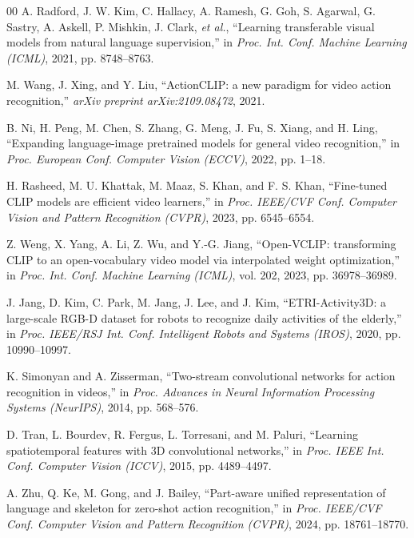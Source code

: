 \documentclass[conference]{IEEEtran}
\begin{document}
\begin{thebibliography}{00}
A. Radford, J. W. Kim, C. Hallacy, A. Ramesh, G. Goh, S. Agarwal, G. Sastry, A. Askell, P. Mishkin, J. Clark, \textit{et al.},
``Learning transferable visual models from natural language supervision,''
in \textit{Proc. Int. Conf. Machine Learning (ICML)}, 2021, pp. 8748--8763.

M. Wang, J. Xing, and Y. Liu,
``ActionCLIP: a new paradigm for video action recognition,''
\textit{arXiv preprint arXiv:2109.08472}, 2021.

B. Ni, H. Peng, M. Chen, S. Zhang, G. Meng, J. Fu, S. Xiang, and H. Ling,
``Expanding language-image pretrained models for general video recognition,''
in \textit{Proc. European Conf. Computer Vision (ECCV)}, 2022, pp. 1--18.

H. Rasheed, M. U. Khattak, M. Maaz, S. Khan, and F. S. Khan,
``Fine-tuned CLIP models are efficient video learners,''
in \textit{Proc. IEEE/CVF Conf. Computer Vision and Pattern Recognition (CVPR)}, 2023, pp. 6545--6554.

Z. Weng, X. Yang, A. Li, Z. Wu, and Y.-G. Jiang,
``Open-VCLIP: transforming CLIP to an open-vocabulary video model via interpolated weight optimization,''
in \textit{Proc. Int. Conf. Machine Learning (ICML)}, vol. 202, 2023, pp. 36978--36989.

J. Jang, D. Kim, C. Park, M. Jang, J. Lee, and J. Kim,
``ETRI-Activity3D: a large-scale RGB-D dataset for robots to recognize daily activities of the elderly,''
in \textit{Proc. IEEE/RSJ Int. Conf. Intelligent Robots and Systems (IROS)}, 2020, pp. 10990--10997.

K. Simonyan and A. Zisserman,
``Two-stream convolutional networks for action recognition in videos,''
in \textit{Proc. Advances in Neural Information Processing Systems (NeurIPS)}, 2014, pp. 568--576.

D. Tran, L. Bourdev, R. Fergus, L. Torresani, and M. Paluri,
``Learning spatiotemporal features with 3D convolutional networks,''
in \textit{Proc. IEEE Int. Conf. Computer Vision (ICCV)}, 2015, pp. 4489--4497.

A. Zhu, Q. Ke, M. Gong, and J. Bailey,
``Part-aware unified representation of language and skeleton for zero-shot action recognition,''
in \textit{Proc. IEEE/CVF Conf. Computer Vision and Pattern Recognition (CVPR)}, 2024, pp. 18761--18770.


\end{thebibliography}
\end{document}
